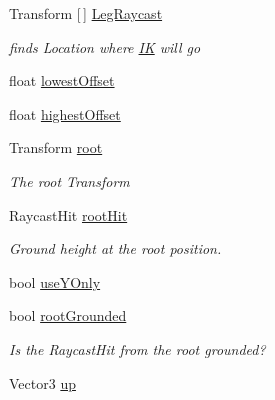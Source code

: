\begin{DoxyCompactItemize}
Transform \mbox{[}$\,$\mbox{]} \mbox{\hyperlink{class_root_motion_1_1_final_i_k_1_1_grounding_a2f92e86bf0ae14cf4eb53cabc6b114e1}{Leg\+Raycast}}
\begin{DoxyCompactList}\small\item\em finds Location where \mbox{\hyperlink{class_root_motion_1_1_final_i_k_1_1_i_k}{IK}} will go \end{DoxyCompactList}\item 
float \mbox{\hyperlink{class_root_motion_1_1_final_i_k_1_1_grounding_a6243b60cf994b4575169d94fa2a1d160}{lowest\+Offset}}
\item 
float \mbox{\hyperlink{class_root_motion_1_1_final_i_k_1_1_grounding_a4c23e0297e098daaf07ec072ab312ed4}{highest\+Offset}}
\item 
Transform \mbox{\hyperlink{class_root_motion_1_1_final_i_k_1_1_grounding_a68b68c68d458cacdea714b642ad0a301}{root}}
\begin{DoxyCompactList}\small\item\em The root Transform \end{DoxyCompactList}\item 
Raycast\+Hit \mbox{\hyperlink{class_root_motion_1_1_final_i_k_1_1_grounding_a4764c2320ed5aff4a3463dd38d2b390f}{root\+Hit}}
\begin{DoxyCompactList}\small\item\em Ground height at the root position. \end{DoxyCompactList}\item 
bool \mbox{\hyperlink{class_root_motion_1_1_final_i_k_1_1_grounding_a04bb7d32e24a31b9ab0021fef1332c8d}{use\+Y\+Only}}
\item 
bool \mbox{\hyperlink{class_root_motion_1_1_final_i_k_1_1_grounding_a7588f93eb1c2b83a0b9c641cfa0fc0d3}{root\+Grounded}}
\begin{DoxyCompactList}\small\item\em Is the Raycast\+Hit from the root grounded? \end{DoxyCompactList}\item 
Vector3 \mbox{\hyperlink{class_root_motion_1_1_final_i_k_1_1_grounding_a9af0fc4bfd15fd3fe330175369f9dcbb}{up}}
\end{DoxyCompactItemize}


